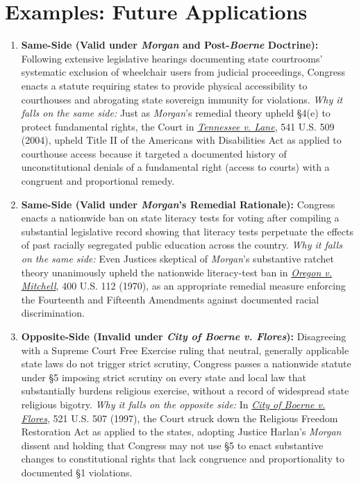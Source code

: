 \documentclass[12pt]{article}
\begin{document}
\section{Examples: Future Applications}

\begin{enumerate}
\item \textbf{Same-Side (Valid under \textit{Morgan} and Post-\textit{Boerne} Doctrine):} Following extensive legislative hearings documenting state courtrooms' systematic exclusion of wheelchair users from judicial proceedings, Congress enacts a statute requiring states to provide physical accessibility to courthouses and abrogating state sovereign immunity for violations. \textit{Why it falls on the same side:} Just as \textit{Morgan}'s remedial theory upheld \S 4(e) to protect fundamental rights, the Court in \href{https://supreme.justia.com/cases/federal/us/541/509/}{\textit{Tennessee v. Lane}}, 541 U.S. 509 (2004), upheld Title II of the Americans with Disabilities Act as applied to courthouse access because it targeted a documented history of unconstitutional denials of a fundamental right (access to courts) with a congruent and proportional remedy.

\item \textbf{Same-Side (Valid under \textit{Morgan}'s Remedial Rationale):} Congress enacts a nationwide ban on state literacy tests for voting after compiling a substantial legislative record showing that literacy tests perpetuate the effects of past racially segregated public education across the country. \textit{Why it falls on the same side:} Even Justices skeptical of \textit{Morgan}'s substantive ratchet theory unanimously upheld the nationwide literacy-test ban in \href{https://supreme.justia.com/cases/federal/us/400/112/}{\textit{Oregon v. Mitchell}}, 400 U.S. 112 (1970), as an appropriate remedial measure enforcing the Fourteenth and Fifteenth Amendments against documented racial discrimination.

\item \textbf{Opposite-Side (Invalid under \textit{City of Boerne v. Flores}):} Disagreeing with a Supreme Court Free Exercise ruling that neutral, generally applicable state laws do not trigger strict scrutiny, Congress passes a nationwide statute under \S 5 imposing strict scrutiny on every state and local law that substantially burdens religious exercise, without a record of widespread state religious bigotry. \textit{Why it falls on the opposite side:} In \href{https://supreme.justia.com/cases/federal/us/521/507/}{\textit{City of Boerne v. Flores}}, 521 U.S. 507 (1997), the Court struck down the Religious Freedom Restoration Act as applied to the states, adopting Justice Harlan's \textit{Morgan} dissent and holding that Congress may not use \S 5 to enact substantive changes to constitutional rights that lack congruence and proportionality to documented \S 1 violations.


\end{enumerate}
\end{document}
